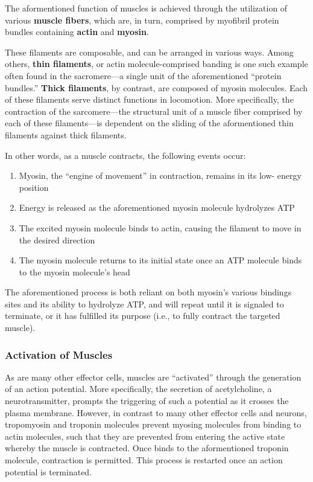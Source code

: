 \documentclass{article}
\begin{document}
The aformentioned function of muscles is achieved through the utilization of
various \textbf{muscle fibers}, which are, in turn, comprised by myofibril
protein bundles containing \textbf{actin} and \textbf{myosin}.

These filaments are composable, and can be arranged in various ways. Among
others, \textbf{thin filaments}, or actin molecule-comprised banding is one such
example often found in the sacromere---a single unit of the aforementioned
``protein bundles.'' \textbf{Thick filaments}, by contrast, are composed of
myosin molecules. Each of these filaments serve distinct functions in
locomotion. More specifically, the contraction of the sarcomere---the structural
unit of a muscle fiber comprised by each of these filaments---is dependent on
the sliding of the aformentioned thin filaments against thick filaments.

In other words, as a muscle contracts, the following events occur:

\begin{enumerate}
    \item Myosin, the ``engine of movement'' in contraction, remains in its low-
    energy position
    \item Energy is released as the aforementioned myosin molecule hydrolyzes
    ATP
    \item The excited myosin molecule binds to actin, causing the filament to
    move in the desired direction
    \item The myosin molecule returns to its initial state once an ATP molecule
    binds to the myosin molecule's head
\end{enumerate}

The aforementioned process is both reliant on both myosin's various bindings
sites and its ability to hydrolyze ATP, and will repeat until it is signaled to
terminate, or it has fulfilled its purpose (i.e., to fully contract the targeted
muscle).

\subsubsection{Activation of Muscles}

As are many other effector cells, muscles are ``activated'' through the
generation of an action potential. More specifically, the secretion of
acetylcholine, a neurotransmitter, prompts the triggering of such a potential
as it crosses the plasma membrane. However, in contrast to many other effector
cells and neurons, tropomyosin and troponin molecules prevent myosing molecules
from binding to actin molecules, such that they are prevented from entering the
active state whereby the muscle is contracted. Once  binds to the
aformentioned troponin molecule, contraction is permitted. This process is
restarted once an action potential is terminated.
\end{document}
